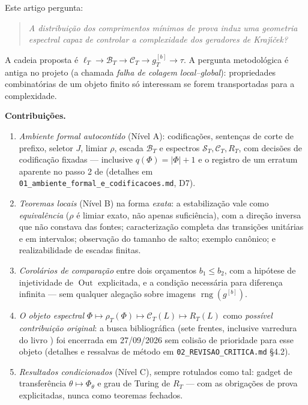 \documentclass[11pt,a4paper]{article}
\theoremstyle{definition}
\theoremstyle{remark}
\newcommand{\Out}{\operatorname{Out}}
\begin{document}
Este artigo pergunta:

\begin{quote}
\emph{A distribuição dos comprimentos mínimos de prova induz uma geometria
espectral capaz de controlar a complexidade dos geradores de
Kraj\'{\i}\v{c}ek?}
\end{quote}

A cadeia proposta é $\ell_T \to \mathcal{B}_T \to \mathcal{C}_T \to g_T^{[b]}
\to \tau$. A pergunta metodológica é antiga no projeto (a chamada \emph{falha de
colagem local--global}): propriedades combinatórias de um objeto finito só
interessam se forem transportadas para a complexidade.

\medskip
\noindent\textbf{Contribuições.}
\begin{enumerate}
  \item \emph{Ambiente formal autocontido} (Nível A): codificações, sentenças de
  corte de prefixo, seletor $J$, limiar $\rho$, escada $\mathcal{B}_T$ e espectros
  $\mathcal{S}_T,\mathcal{C}_T,R_T$, com decisões de codificação fixadas —
  inclusive $q(\Phi)=|\Phi|+1$ e o registro de um erratum aparente no passo 2 de
  \cite{Krajicek2025} (detalhes em \texttt{01\_ambiente\_formal\_e\_codificacoes.md},
  D7).
  \item \emph{Teoremas locais} (Nível B) na forma \emph{exata}: a estabilização
  vale como \emph{equivalência} ($\rho$ é limiar exato, não apenas suficiência),
  com a direção inversa que não constava das fontes; caracterização completa das
  transições unitárias e em intervalos; observação do tamanho de salto;
  exemplo canônico; e realizabilidade de escadas finitas.
  \item \emph{Corolários de comparação} entre dois orçamentos $b_1 \leq b_2$,
  com a hipótese de injetividade de $\Out$ explicitada, e a condição necessária
  para diferença infinita — sem qualquer alegação sobre imagens
  $\operatorname{rng}(g^{[b]})$.
  \item \emph{O objeto espectral} $\Phi \mapsto \rho_T(\Phi) \mapsto
  \mathcal{C}_T(L) \mapsto R_T(L)$ como \emph{possível contribuição original}:
  a busca bibliográfica (sete frentes, inclusive varredura do livro
  \cite{Krajicek2025generators}) foi encerrada em 27/09/2026 sem colisão de
  prioridade para esse objeto (detalhes e ressalvas de método em
  \texttt{02\_REVISAO\_CRITICA.md} §4.2).
  \item \emph{Resultados condicionados} (Nível C), sempre rotulados como tal:
  gadget de transferência $\theta \mapsto \Phi_\theta$ e grau de Turing de $R_T$
  — com as obrigações de prova explicitadas, nunca como teoremas fechados.
\end{enumerate}
\end{document}
